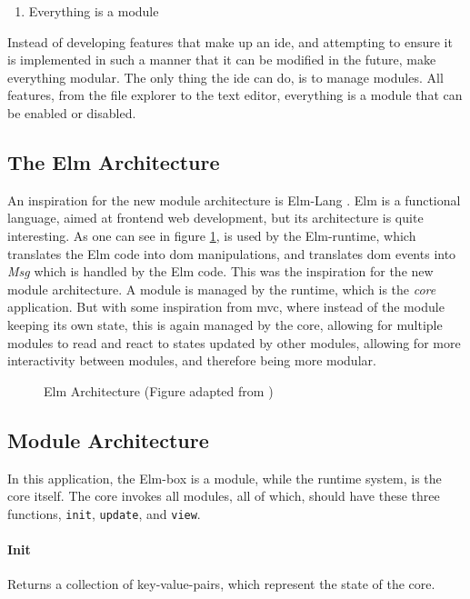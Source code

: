 \begin{enumerate}
  \item Everything is a module
\end{enumerate}

Instead of developing features that make up an \gls{ide}, and attempting to
ensure it is implemented in such a manner that it can be modified in the future,
make everything modular. The only thing the \gls{ide} can do, is to manage
modules. All features, from the file explorer to the text editor, everything is
a module that can be enabled or disabled.

\subsection{The Elm Architecture}

An inspiration for the new module architecture is Elm-Lang \cite{elmLang}. Elm
is a functional language, aimed at frontend web development, but its
architecture is quite interesting. As one can see in figure
\ref{fig:elmArchitecture}, is used by the Elm-runtime, which translates the Elm
code into \gls{dom} manipulations, and translates \gls{dom} events into
\textit{Msg} which is handled by the Elm code. This was the inspiration for the
new module architecture. A module is managed by the runtime, which is the
\textit{core} application. But with some inspiration from \gls{mvc}, where
instead of the module keeping its own state, this is again managed by the core,
allowing for multiple modules to read and react to states updated by other
modules, allowing for more interactivity between modules, and therefore being
more modular.

\begin{figure}
  \centering
  
  \caption{Elm Architecture (Figure adapted from \cite{elmFig})}
  \label{fig:elmArchitecture}
\end{figure}

\subsection{Module Architecture}

In this application, the Elm-box is a module, while the runtime system, is the
core itself. The core invokes all modules, all of which, should have these three
functions, \lstinline{init}, \lstinline{update}, and \lstinline{view}.

\paragraph{Init} Returns a collection of key-value-pairs, which represent
the state of the core.

